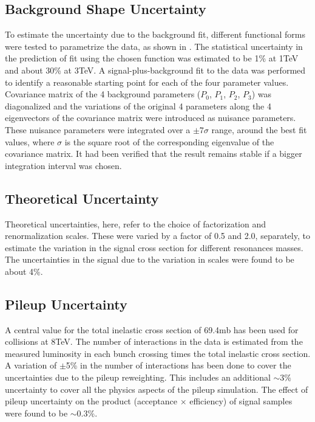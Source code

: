 \subsection{Background Shape Uncertainty}
To estimate the uncertainty due to the background fit, different functional forms were tested to parametrize the data, as shown in 
\fig{\ref{fig:DiffFitFunc}}. The statistical uncertainty in the prediction of fit using the chosen function was estimated to be 1\% at 1\unit{TeV}
and about 30\% at 3\unit{TeV}. A signal-plus-background fit to  the data was performed to identify a reasonable starting point for each of the four 
parameter values. Covariance matrix of the 4 background parameters ($P_0$, $P_1$, $P_2$, $P_3$) was diagonalized and the variations of the original 
4 parameters along the 4 eigenvectors of the covariance matrix were introduced as nuisance parameters. These nuisance parameters were integrated
over a $\pm7\sigma$ range, around the best fit values, where $\sigma$ is the square root of the corresponding eigenvalue of the covariance matrix. 
It had been verified that the result remains stable if a bigger integration interval was chosen.

\subsection{Theoretical Uncertainty}
Theoretical uncertainties, here, refer to the choice of factorization and renormalization scales. These were varied by a factor of 0.5 and 2.0, separately, to estimate the variation in the signal cross section for different resonances masses. The uncertainties in the signal due to the 
variation in scales were found to be about 4\%.
%

\subsection{Pileup Uncertainty }
A central value for the total inelastic cross section of 69.4\unit{mb}\cite{Web:Pileup,CMS-PAS-LUM-13-001} has been used for \pp collisions at 
8\unit{TeV}. The number of interactions in the data is estimated from the measured luminosity in each bunch crossing times the total inelastic cross 
section. A variation of $\pm$5\%  in the number of interactions has been done to cover the uncertainties due to the pileup reweighting. This
includes an additional $\sim3\%$ uncertainty to cover all the physics aspects of the pileup simulation. The effect of pileup uncertainty on the 
product (acceptance $\times$ efficiency) of \qstar signal samples were found to be $\sim$0.3\%.

